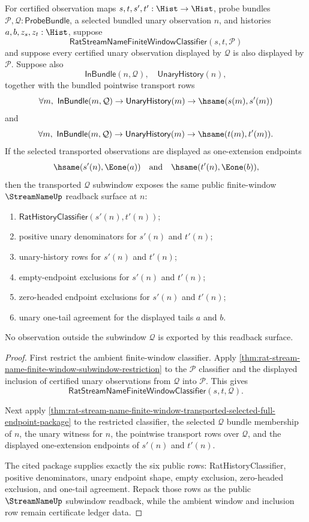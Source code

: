 \begin{theorem}
\label{thm:streamname-transported-subwindow-public-readback}
For certified observation maps $s,t,s',t':\Hist\to\Hist$, probe bundles
$\mathcal{P},\mathcal{Q}:\mathsf{ProbeBundle}$, a selected bundled unary
observation $n$, and histories $a,b,z_s,z_t:\Hist$, suppose
$$
\mathsf{RatStreamNameFiniteWindowClassifier}(s,t,\mathcal{P})
$$
and suppose every certified unary observation displayed by $\mathcal{Q}$ is
also displayed by $\mathcal{P}$. Suppose also
$$
\mathsf{InBundle}(n,\mathcal{Q}),
\quad
\mathsf{UnaryHistory}(n),
$$
together with the bundled pointwise transport rows
$$
\forall m,\ \mathsf{InBundle}(m,\mathcal{Q})\to
\mathsf{UnaryHistory}(m)\to\hsame(s(m),s'(m))
$$
and
$$
\forall m,\ \mathsf{InBundle}(m,\mathcal{Q})\to
\mathsf{UnaryHistory}(m)\to\hsame(t(m),t'(m)).
$$
If the selected transported observations are displayed as one-extension
endpoints
$$
\hsame(s'(n),\Eone(a))\quad\text{and}\quad \hsame(t'(n),\Eone(b)),
$$
then the transported $\mathcal{Q}$ subwindow exposes the same public
finite-window $\StreamNameUp$ readback surface at $n$:
\begin{enumerate}
  \item $\mathsf{RatHistoryClassifier}(s'(n),t'(n))$;
  \item positive unary denominators for $s'(n)$ and $t'(n)$;
  \item unary-history rows for $s'(n)$ and $t'(n)$;
  \item empty-endpoint exclusions for $s'(n)$ and $t'(n)$;
  \item zero-headed endpoint exclusions for $s'(n)$ and $t'(n)$;
  \item unary one-tail agreement for the displayed tails $a$ and $b$.
\end{enumerate}
No observation outside the subwindow $\mathcal{Q}$ is exported by this
readback surface.
\end{theorem}
\begin{proof}
First restrict the ambient finite-window classifier. Apply
\autoref{thm:rat-stream-name-finite-window-subwindow-restriction} to the
$\mathcal{P}$ classifier and the displayed inclusion of certified unary
observations from $\mathcal{Q}$ into $\mathcal{P}$. This gives
$$
\mathsf{RatStreamNameFiniteWindowClassifier}(s,t,\mathcal{Q}).
$$

Next apply
\autoref{thm:rat-stream-name-finite-window-transported-selected-full-endpoint-package}
to the restricted classifier, the selected $\mathcal{Q}$ bundle membership of
$n$, the unary witness for $n$, the pointwise transport rows over
$\mathcal{Q}$, and the displayed one-extension endpoints of $s'(n)$ and
$t'(n)$.

The cited package supplies exactly the six public rows: RatHistoryClassifier,
positive denominators, unary endpoint shape, empty exclusion, zero-headed
exclusion, and one-tail agreement. Repack those rows as the public
$\StreamNameUp$ subwindow readback, while the ambient window and inclusion row
remain certificate ledger data.
\end{proof}

